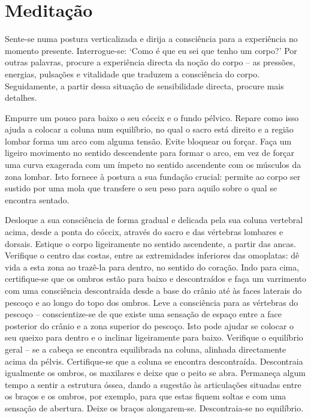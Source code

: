 
\chapter{Meditação}


Sente-se numa postura verticalizada e dirija a consciência para a experiência no momento presente. Interrogue-se: `Como é que eu sei que tenho um corpo?' Por outras palavras, procure a experiência directa da noção do corpo -- as pressões, energias, pulsações e vitalidade que traduzem a consciência do corpo. Seguidamente, a partir dessa situação de sensibilidade directa, procure mais detalhes.

Empurre um pouco para baixo o seu cóccix e o fundo pélvico. Repare como isso ajuda a colocar a coluna num equilíbrio, no qual o sacro está direito e a região lombar forma um arco com alguma tensão. Evite bloquear ou forçar. Faça um ligeiro movimento no sentido descendente para formar o arco, em vez de forçar uma curva exagerada com um ímpeto no sentido ascendente com os músculos da zona lombar. Isto fornece à postura a sua fundação crucial: permite ao corpo ser sustido por uma mola que transfere o seu peso para aquilo sobre o qual se encontra sentado.

Desloque a sua consciência de forma gradual e delicada pela sua coluna vertebral acima, desde a ponta do cóccix, através do sacro e das vértebras lombares e dorsais. Estique o corpo ligeiramente no sentido ascendente, a partir das ancas. Verifique o centro das costas, entre as extremidades inferiores das omoplatas: dê vida a esta zona ao trazê-la para dentro, no sentido do coração. Indo para cima, certifique-se que os ombros estão para baixo e descontraídos e faça um varrimento com uma consciência descontraída desde a base do crânio até às faces laterais do pescoço e ao longo do topo dos ombros. Leve a consciência para as vértebras do pescoço -- conscientize-se de que existe uma sensação de espaço entre a face posterior do crânio e a zona superior do pescoço. Isto pode ajudar se colocar o seu queixo para dentro e o inclinar ligeiramente para baixo. Verifique o equilíbrio geral -- se a cabeça se encontra equilibrada na coluna, alinhada directamente acima da pélvis. Certifique-se que a coluna se encontra descontraída. Descontraia igualmente os ombros, os maxilares e deixe que o peito se abra. Permaneça algum tempo a sentir a estrutura óssea, dando a sugestão às articulações situadas entre os braços e os ombros, por exemplo, para que estas fiquem soltas e com uma sensação de abertura. Deixe os braços alongarem-se. Descontraia-se no equilíbrio.

